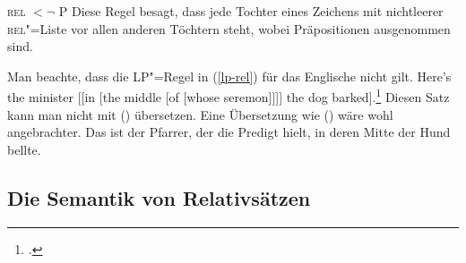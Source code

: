 \ea
\label{lp-rel}
\textsc{rel}  $< \neg$ P
\z
Diese Regel besagt, dass jede Tochter eines Zeichens mit nichtleerer 
\textsc{rel}"=Liste vor allen anderen Töchtern steht, wobei Präpositionen ausgenommen sind. 

Man beachte, dass die LP"=Regel in (\ref{lp-rel}) für das
Englische nicht gilt.
\ea
Here's the minister [[in [the middle [of [whose seremon]]]] 
the dog barked].\footnote{ 
	.
}
\z
Diesen Satz kann man nicht mit () übersetzen.
\z
Eine Übersetzung wie () wäre wohl angebrachter.
\ea
Das ist der Pfarrer, der die Predigt hielt, in deren Mitte der Hund bellte.
\z
{}


\subsection{Die Semantik von Relativsätzen}
\label{sec-rs-sem-anal}

